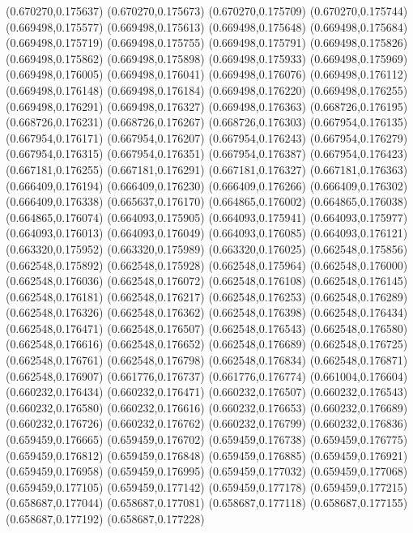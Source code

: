 (0.670270,0.175637)
(0.670270,0.175673)
(0.670270,0.175709)
(0.670270,0.175744)
(0.669498,0.175577)
(0.669498,0.175613)
(0.669498,0.175648)
(0.669498,0.175684)
(0.669498,0.175719)
(0.669498,0.175755)
(0.669498,0.175791)
(0.669498,0.175826)
(0.669498,0.175862)
(0.669498,0.175898)
(0.669498,0.175933)
(0.669498,0.175969)
(0.669498,0.176005)
(0.669498,0.176041)
(0.669498,0.176076)
(0.669498,0.176112)
(0.669498,0.176148)
(0.669498,0.176184)
(0.669498,0.176220)
(0.669498,0.176255)
(0.669498,0.176291)
(0.669498,0.176327)
(0.669498,0.176363)
(0.668726,0.176195)
(0.668726,0.176231)
(0.668726,0.176267)
(0.668726,0.176303)
(0.667954,0.176135)
(0.667954,0.176171)
(0.667954,0.176207)
(0.667954,0.176243)
(0.667954,0.176279)
(0.667954,0.176315)
(0.667954,0.176351)
(0.667954,0.176387)
(0.667954,0.176423)
(0.667181,0.176255)
(0.667181,0.176291)
(0.667181,0.176327)
(0.667181,0.176363)
(0.666409,0.176194)
(0.666409,0.176230)
(0.666409,0.176266)
(0.666409,0.176302)
(0.666409,0.176338)
(0.665637,0.176170)
(0.664865,0.176002)
(0.664865,0.176038)
(0.664865,0.176074)
(0.664093,0.175905)
(0.664093,0.175941)
(0.664093,0.175977)
(0.664093,0.176013)
(0.664093,0.176049)
(0.664093,0.176085)
(0.664093,0.176121)
(0.663320,0.175952)
(0.663320,0.175989)
(0.663320,0.176025)
(0.662548,0.175856)
(0.662548,0.175892)
(0.662548,0.175928)
(0.662548,0.175964)
(0.662548,0.176000)
(0.662548,0.176036)
(0.662548,0.176072)
(0.662548,0.176108)
(0.662548,0.176145)
(0.662548,0.176181)
(0.662548,0.176217)
(0.662548,0.176253)
(0.662548,0.176289)
(0.662548,0.176326)
(0.662548,0.176362)
(0.662548,0.176398)
(0.662548,0.176434)
(0.662548,0.176471)
(0.662548,0.176507)
(0.662548,0.176543)
(0.662548,0.176580)
(0.662548,0.176616)
(0.662548,0.176652)
(0.662548,0.176689)
(0.662548,0.176725)
(0.662548,0.176761)
(0.662548,0.176798)
(0.662548,0.176834)
(0.662548,0.176871)
(0.662548,0.176907)
(0.661776,0.176737)
(0.661776,0.176774)
(0.661004,0.176604)
(0.660232,0.176434)
(0.660232,0.176471)
(0.660232,0.176507)
(0.660232,0.176543)
(0.660232,0.176580)
(0.660232,0.176616)
(0.660232,0.176653)
(0.660232,0.176689)
(0.660232,0.176726)
(0.660232,0.176762)
(0.660232,0.176799)
(0.660232,0.176836)
(0.659459,0.176665)
(0.659459,0.176702)
(0.659459,0.176738)
(0.659459,0.176775)
(0.659459,0.176812)
(0.659459,0.176848)
(0.659459,0.176885)
(0.659459,0.176921)
(0.659459,0.176958)
(0.659459,0.176995)
(0.659459,0.177032)
(0.659459,0.177068)
(0.659459,0.177105)
(0.659459,0.177142)
(0.659459,0.177178)
(0.659459,0.177215)
(0.658687,0.177044)
(0.658687,0.177081)
(0.658687,0.177118)
(0.658687,0.177155)
(0.658687,0.177192)
(0.658687,0.177228)
